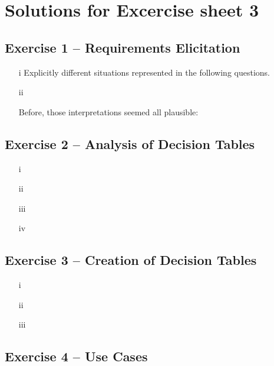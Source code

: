 \documentclass{scrartcl}
\begin{document}
\section*{Solutions for Excercise sheet 3}

\subsection*{Exercise 1 – Requirements Elicitation}
\begin{itemize}
    \item[i] Explicitly different situations represented in the following questions. \\
    \item[ii]
        
        Before, those interpretations seemed all plausible:
        
\end{itemize}



\subsection*{Exercise 2 – Analysis of Decision Tables}

\begin{itemize}
    \item[i]
    \item[ii]
    \item[iii]
    \item[iv]
\end{itemize}

\subsection*{Exercise 3 – Creation of Decision Tables}

\begin{itemize}
    \item[i]
    \item[ii]
    \item[iii]
\end{itemize}
\subsection*{Exercise 4 – Use Cases}
\end{document}
